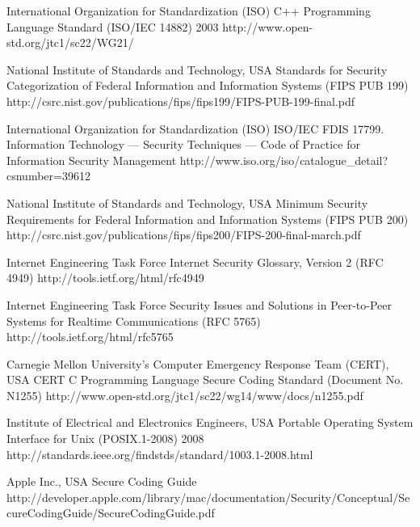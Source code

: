 \begin{thebibliography}{9}
		{International Organization for Standardization (ISO)}
		{{C++} Programming Language Standard ({ISO/IEC} 14882)}
		{2003}
		{http://www.open-std.org/jtc1/sc22/WG21/}
		
		{National Institute of Standards and Technology, USA}
		{Standards for Security Categorization of Federal Information and Information Systems ({FIPS PUB} 199)}
		{}
		{http://csrc.nist.gov/publications/fips/fips199/FIPS-PUB-199-final.pdf}
		
		{International Organization for Standardization (ISO)}
		{ISO/IEC FDIS 17799. Information Technology — Security Techniques — Code of Practice for Information Security Management}
		{}
		{http://www.iso.org/iso/catalogue_detail?csnumber=39612}
	
		{National Institute of Standards and Technology, USA}
		{Minimum Security Requirements for Federal Information and Information Systems ({FIPS PUB} 200)}
		{}
		{http://csrc.nist.gov/publications/fips/fips200/FIPS-200-final-march.pdf}
	
		{Internet Engineering Task Force}
		{Internet Security Glossary, Version 2 ({RFC} 4949)}
		{}
		{http://tools.ietf.org/html/rfc4949}
		
		{Internet Engineering Task Force}
		{Security Issues and Solutions in Peer-to-Peer Systems for Realtime Communications ({RFC} 5765)}
		{}
		{http://tools.ietf.org/html/rfc5765}
	
		{Carnegie Mellon University's Computer Emergency Response Team (CERT), USA}
		{{CERT} {C} Programming Language Secure Coding Standard (Document No. N1255)}
		{}
		{http://www.open-std.org/jtc1/sc22/wg14/www/docs/n1255.pdf}
		
		{Institute of Electrical and Electronics Engineers, USA}
		{Portable Operating System Interface for {U}nix ({POSIX}.1-2008)}
		{2008}
		{http://standards.ieee.org/findstds/standard/1003.1-2008.html}
		
		{Apple Inc., USA}
		{Secure Coding Guide}
		{}
		{http://developer.apple.com/library/mac/documentation/Security/Conceptual/SecureCodingGuide/SecureCodingGuide.pdf}


\end{thebibliography}
